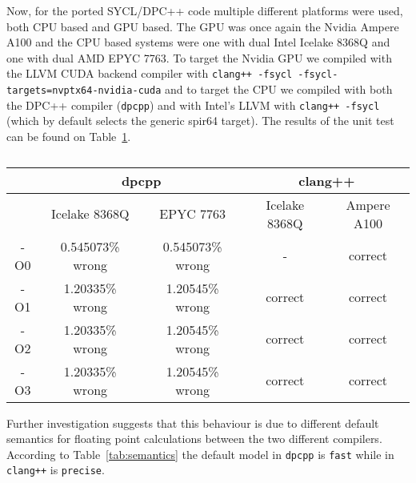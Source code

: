 Now, for the ported SYCL/DPC++ code multiple different platforms were used, both CPU based and GPU based.
The GPU was once again the Nvidia Ampere A100 and the CPU based systems were one with dual Intel Icelake 8368Q and one with dual AMD EPYC 7763.
To target the Nvidia GPU we compiled with the LLVM CUDA backend compiler with \texttt{clang++ -fsycl -fsycl-targets=nvptx64-nvidia-cuda} and to target the CPU we compiled with both the DPC++ compiler (\texttt{dpcpp}) and with Intel's LLVM with \texttt{clang++ -fsycl} (which by default selects the generic spir64 target).
The results of the unit test can be found on Table~\ref{tab:correctness}.

\begin{center}
	\begin{table}
		\begin{tabular}{||c c c c c||}
			\hline
			    & \multicolumn{2}{c}{dpcpp} & \multicolumn{2}{c||}{clang++}                               \\ [0.5ex]
			\hline
			    & Icelake 8368Q             & EPYC 7763                     & Icelake 8368Q & Ampere A100 \\ [0.5ex]
			\hline\hline
			-O0 & 0.545073\% wrong          & 0.545073\% wrong              & -             & correct     \\ [0.3ex]
			\hline
			-O1 & 1.20335\% wrong           & 1.20545\% wrong               & correct       & correct     \\ [0.3ex]
			\hline
			-O2 & 1.20335\% wrong           & 1.20545\% wrong               & correct       & correct     \\ [0.3ex]
			\hline
			-O3 & 1.20335\% wrong           & 1.20545\% wrong               & correct       & correct     \\ [0.3ex]
			\hline
		\end{tabular}
		\caption{\label{tab:correctness}}
	\end{table}
\end{center}

Further investigation suggests that this behaviour is due to different default semantics for floating point calculations between the two different compilers.
According to Table~\ref{tab:semantics} the default model in \texttt{dpcpp} is \texttt{fast} while in \texttt{clang++} is \texttt{precise}.

